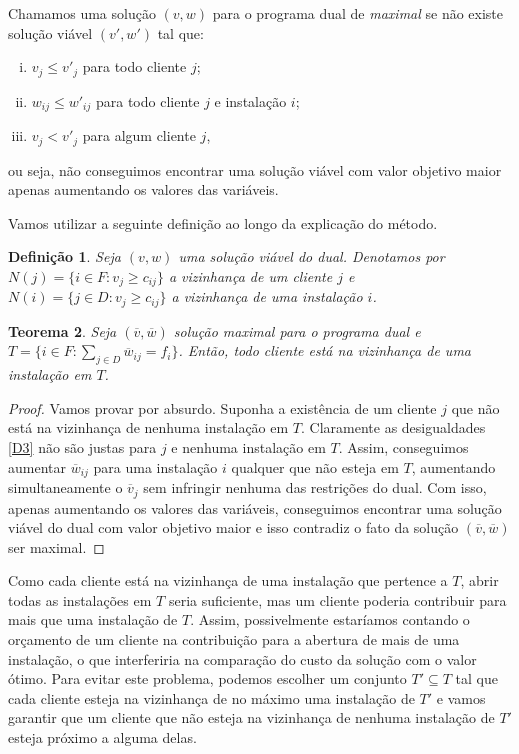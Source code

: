 \documentclass[12pt]{article}
\newtheorem{theorem}{Teorema}[section]
\newtheorem{definition}[theorem]{Definição}
\begin{document}
Chamamos uma solução $(v,w)$ para o programa dual de \emph{maximal} se não existe solução viável $(v',w')$ tal que:
\begin{enumerate}[(i)]
    \item $v_j \leq v'_j$ para todo cliente $j$;
    \item $w_{ij} \leq w'_{ij}$ para todo cliente $j$ e instalação $i$;
    \item $v_j < v'_j$ para algum cliente $j$,
\end{enumerate}
ou seja, não conseguimos encontrar uma solução viável com valor objetivo maior apenas aumentando os valores das variáveis.

Vamos utilizar a seguinte definição ao longo da explicação do método.
\begin{definition}
    Seja $(v,w)$ uma solução viável do dual. Denotamos por $N(j) = \{i \in F:v_j \geq c_{ij}\}$ a \emph{vizinhança} de um cliente $j$ e $N(i) = \{j \in D:v_j \geq c_{ij}\}$ a \emph{vizinhança} de uma instalação $i$.
\end{definition}

\begin{theorem}
    Seja $(\overline v, \overline w)$ solução maximal para o programa dual e $T = \{i \in F: \sum_{j \in D} \overline{w}_{ij} = f_i\}$. Então, todo cliente está na vizinhança de uma instalação em $T$.      
\end{theorem}
\begin{proof}
    Vamos provar por absurdo. Suponha a existência de um cliente $j$ que não está na vizinhança de nenhuma instalação em $T$. Claramente as desigualdades \eqref{D3} não são justas para $j$ e nenhuma instalação em $T$. Assim, conseguimos aumentar $\overline{w}_{ij}$ para uma instalação $i$ qualquer que não esteja em $T$, aumentando simultaneamente o $\overline{v}_j$ sem infringir nenhuma das restrições do dual. Com isso, apenas aumentando os valores das variáveis, conseguimos encontrar uma solução viável do dual com valor objetivo maior e isso contradiz o fato da solução $(\overline{v},\overline{w})$ ser maximal. 
\end{proof}

Como cada cliente está na vizinhança de uma instalação que pertence a $T$, abrir todas as instalações em $T$ seria suficiente, mas um cliente poderia contribuir para mais que uma instalação de $T$. Assim, possivelmente estaríamos contando o orçamento de um cliente na contribuição para a abertura de mais de uma instalação, o que interferiria na comparação do custo da solução com o valor ótimo.
Para evitar este problema, podemos escolher um conjunto $T' \subseteq T$ tal que cada cliente esteja na vizinhança de no máximo uma instalação de $T'$ e vamos garantir que um cliente que não esteja na vizinhança de nenhuma instalação de $T'$ esteja próximo a alguma delas.
\end{document}
